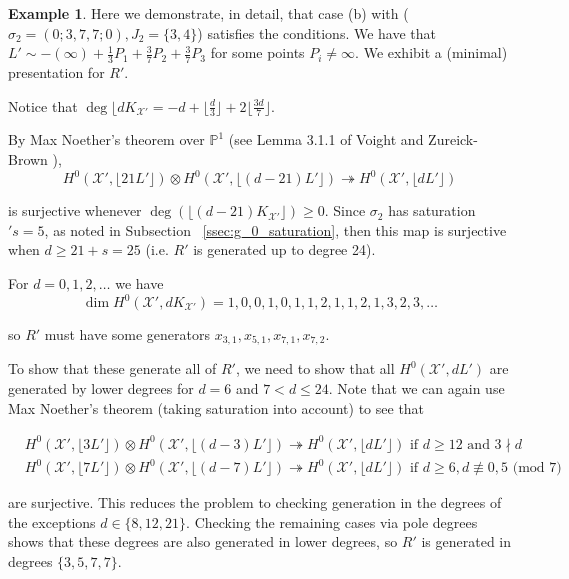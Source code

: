 \documentclass{amsart}
\theoremstyle{plain}
\theoremstyle{definition}
\newtheorem{example}[thm]{Example}
\theoremstyle{remark}
\numberwithin{equation}{section}
\newcommand\BP{{\mathbb P}}
\newcommand \sx{\mathscr X}
\newcommand \halfcan{L}
\begin{document}
\begin{example}
\label{ex:base-377}
Here we demonstrate, in detail, that case (b) with ($\sigma_2 =
(0; 3, 7, 7; 0), J_2 = \{3, 4\}$) satisfies the conditions.
We have that $\halfcan' \sim -(\infty) + \frac{1}{3} P_1 +
\frac{3}{7} P_2 + \frac{3}{7} P_3$ for some points $P_i \neq \infty$.
We exhibit a (minimal) presentation for $R'$.

Notice that $\deg \lfloor d K_{\sx'} = -d + \lfloor \frac{d}{3}
\rfloor + 2 \lfloor \frac{3d}{7} \rfloor$.

By Max Noether's theorem over $\BP^1$ (see Lemma 3.1.1 of Voight
and Zureick-Brown \cite{vzb:stacky}),
\[
	H^0 (\sx', \lfloor 21 \halfcan' \rfloor) \otimes H^0 (\sx', \lfloor
	(d - 21) \halfcan' \rfloor) \twoheadrightarrow H^0 (\sx', \lfloor
	d \halfcan' \rfloor)
\]

\noindent
is surjective whenever $\deg (\lfloor (d - 21) K_{\sx'} \rfloor)
\geq 0$. Since $\sigma_2$ has saturation $'s = 5$, as noted in
Subsection ~\ref{ssec:g_0_saturation}, then this map is surjective
when $d \geq 21 + s = 25$ (i.e. $R'$ is generated up to degree 24).

For $d = 0, 1, 2, \ldots$ we have
\[
	\dim H^0 (\sx', d K_{\sx'}) = 1, 0, 0, 1, 0, 1, 1, 2, 1, 1, 2, 1, 3, 2, 3, \ldots
\]

\noindent
so $R'$ must have some generators $x_{3, 1}, x_{5, 1}, x_{7, 1},
x_{7, 2}$.

To show that these generate all of $R'$, we need to show that all
$H^0 (\sx', d \halfcan')$ are generated by lower degrees for $d = 6$
and $7 < d \leq 24$. Note that we can again use Max Noether's theorem
(taking saturation into account) to see that

\begin{align*}
	&H^0 (\sx', \lfloor 3 \halfcan' \rfloor) \otimes H^0 (\sx', \lfloor
	(d - 3) \halfcan' \rfloor) \twoheadrightarrow H^0 (\sx', \lfloor
	d \halfcan' \rfloor) \text{ if } d \geq 12 \text{ and } 3 \nmid d \\
	&H^0 (\sx', \lfloor 7 \halfcan' \rfloor) \otimes H^0 (\sx', \lfloor
	(d - 7) \halfcan' \rfloor) \twoheadrightarrow H^0 (\sx', \lfloor
	d \halfcan' \rfloor) \text{ if } d \geq 6, d \not\equiv 0, 5
	\text{ (mod } 7)
\end{align*}

\noindent
are surjective. This reduces the problem to checking generation
in the degrees of the exceptions $d \in \{8, 12, 21\}$.
Checking the remaining cases via pole degrees shows that
these degrees are also generated in lower degrees,
so $R'$ is generated in degrees $\{3, 5, 7, 7\}$.


\end{example}
\end{document}
